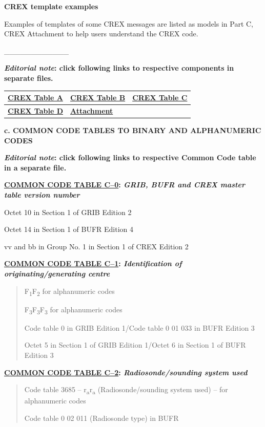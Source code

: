 \textbf{CREX template examples}

Examples of templates of some CREX messages are listed as models in Part C, CREX Attachment to help users understand the CREX code.

\_\_\_\_\_\_\_\_\_\_\_\_

\textbf{{\emph{Editorial note}: click following links to respective components in separate files.}}

\begin{longtable}[]{@{}lll@{}}
\toprule
\href{WMO306_vI2_CREX_TableA_en.docx}{\textbf{CREX Table A}} & \href{WMO306_vI2_CREX_ClassOfElements_en.docx}{\textbf{CREX Table B}} & \href{WMO306_vI2_CREX_TableC_en.docx}{\textbf{CREX Table C}}\tabularnewline
\midrule
\endhead
\href{WMO306_vI2_CREX_TableD_en.docx}{\textbf{CREX Table D}} & \href{WMO306_vI2_CREX_att_en.docx}{\textbf{Attachment}} &\tabularnewline
\bottomrule
\end{longtable}

\textbf{c. COMMON CODE TABLES TO BINARY AND ALPHANUMERIC CODES}

\textbf{\emph{Editorial note}: click following links to respective Common Code table in a separate file.}

\textbf{\href{WMO306_vI2_CommonTable_en.pdf}{COMMON CODE TABLE C--0}: \emph{GRIB, BUFR and CREX master table version number}}

Octet 10 in Section 1 of GRIB Edition 2

Octet 14 in Section 1 of BUFR Edition 4

vv and bb in Group No. 1 in Section 1 of CREX Edition 2

\textbf{\href{WMO306_vI2_CommonTable_en.pdf}{COMMON CODE TABLE C--1}: \emph{Identification of originating/generating centre}}

\begin{quote}
F\textsubscript{1}F\textsubscript{2} for alphanumeric codes

F\textsubscript{3}F\textsubscript{3}F\textsubscript{3} for alphanumeric codes

Code table 0 in GRIB Edition 1/Code table 0 01 033 in BUFR Edition 3

Octet 5 in Section 1 of GRIB Edition 1/Octet 6 in Section 1 of BUFR Edition 3
\end{quote}

\textbf{\href{WMO306_vI2_CommonTable_en.pdf}{COMMON CODE TABLE C--2}: \emph{Radiosonde/sounding system used}}

\begin{quote}
Code table 3685 -- r\textsubscript{a}r\textsubscript{a} (Radiosonde/sounding system used) -- for alphanumeric codes

Code table 0 02 011 (Radiosonde type) in BUFR
\end{quote}


